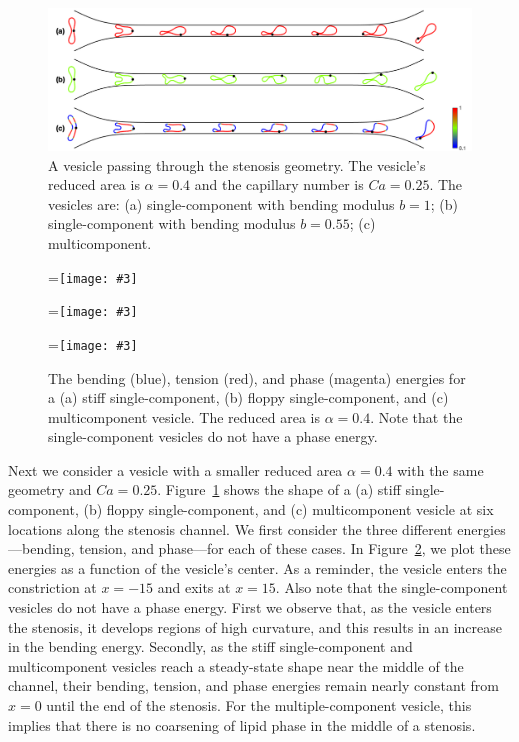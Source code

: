 \documentclass[twoside,twocolumn,9pt]{article}
\newcommand{\subfigimg}[3][,]{%
  \setbox1=\hbox{\texttt{[image: \#3]}}%
  \leavevmode\rlap{\usebox1}%
  \rlap{\hspace*{0pt}\raisebox{\dimexpr\ht1-0\baselineskip}{\bf
  \normalsize #2}}%
  \phantom{\usebox1}%
}
\begin{document}
\begin{figure}[h]
  \centering
  \includegraphics[width=0.9\linewidth]{figures/STENOSIS_RAp4MCp5.pdf}
  \caption{\label{fig:RA4} \small A vesicle passing through the stenosis
  geometry. The vesicle's reduced area is $\alpha = 0.4$ and the
  capillary number is $Ca = 0.25$. The vesicles are: (a) single-component
  with bending modulus $b=1$; (b) single-component with bending modulus
  $b=0.55$; (c) multicomponent.}
\end{figure}

\begin{figure}[ht]
  \centering
  \subfigimg[width=0.3\linewidth]{(a)}{figures/SC_energy.pdf}
  \subfigimg[width=0.3\linewidth]{(b)}{figures/SCp55_energy.pdf}
  \subfigimg[width=0.3\linewidth]{(c)}{figures/MCp5_energy.pdf}
  \caption{\label{fig:Energy} \small The bending (blue), tension (red),
  and phase (magenta) energies for a (a) stiff single-component, (b)
  floppy single-component, and (c) multicomponent vesicle. The reduced
  area is $\alpha = 0.4$. Note that the single-component vesicles do not
  have a phase energy.} 
\end{figure}


Next we consider a vesicle with a smaller reduced area $\alpha=0.4$ with the same geometry and $Ca=0.25$.
Figure~\ref{fig:RA4} shows  the shape of  
a (a) stiff single-component, (b) floppy single-component, and (c) multicomponent
vesicle at six locations along the stenosis channel. We first consider the three different energies---bending,
tension, and phase---for each of these cases. In
Figure~\ref{fig:Energy}, we plot these energies as a function of the
vesicle's center. As a reminder, the vesicle enters the constriction at
$x=-15$ and exits at $x=15$. Also note that the single-component
vesicles do not have a phase energy. 
First we observe that, as the vesicle enters the stenosis, it
develops regions of high curvature, and this results in an increase in
the bending energy. Secondly, as the stiff single-component and
multicomponent vesicles reach a steady-state shape near the middle of
the channel, their bending, tension, and phase energies remain nearly
constant from $x=0$ until the end of the stenosis. For the multiple-component vesicle,
this implies that there is no coarsening of lipid phase in the middle of a stenosis. 
\end{document}
